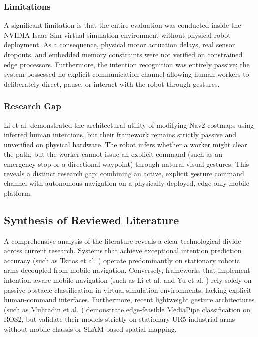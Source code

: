 \subsubsection{Limitations}
A significant limitation is that the entire evaluation was conducted inside the NVIDIA Isaac Sim virtual simulation environment without physical robot deployment. As a consequence, physical motor actuation delays, real sensor dropouts, and embedded memory constraints were not verified on constrained edge processors. Furthermore, the intention recognition was entirely passive; the system possessed no explicit communication channel allowing human workers to deliberately direct, pause, or interact with the robot through gestures.

\subsubsection{Research Gap}
Li et al. demonstrated the architectural utility of modifying Nav2 costmaps using inferred human intentions, but their framework remains strictly passive and unverified on physical hardware. The robot infers whether a worker might clear the path, but the worker cannot issue an explicit command (such as an emergency stop or a directional waypoint) through natural visual gestures. This reveals a distinct research gap: combining an active, explicit gesture command channel with autonomous navigation on a physically deployed, edge-only mobile platform.

\subsection{Synthesis of Reviewed Literature}
A comprehensive analysis of the literature reveals a clear technological divide across current research. Systems that achieve exceptional intention prediction accuracy (such as Tsitos et al. \cite{tsitos2022}) operate predominantly on stationary robotic arms decoupled from mobile navigation. Conversely, frameworks that implement intention-aware mobile navigation (such as Li et al. \cite{li2023} and Yu et al. \cite{yu2024}) rely solely on passive obstacle classification in virtual simulation environments, lacking explicit human-command interfaces. Furthermore, recent lightweight gesture architectures (such as Muhtadin et al. \cite{muhtadin2025}) demonstrate edge-feasible MediaPipe classification on ROS2, but validate their models strictly on stationary UR5 industrial arms without mobile chassis or SLAM-based spatial mapping.

